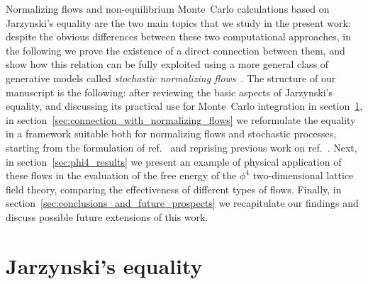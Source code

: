 \documentclass[11pt]{article}
\begin{document}
Normalizing flows and non-equilibrium Monte~Carlo calculations based on Jarzynski's equality are the two main topics that we study in the present work: despite the obvious differences between these two computational approaches, in the following we prove the existence of a direct connection between them, and show how this relation can be fully exploited using a more general class of generative models called \emph{stochastic normalizing flows}~\cite{Wu:2020snf}. The structure of our manuscript is the following: after reviewing the basic aspects of Jarzynski's equality, and discussing its practical use for Monte~Carlo integration in section~\ref{sec:Jarzynski_equality}, in section~\ref{sec:connection_with_normalizing_flows} we reformulate the equality in a framework suitable both for normalizing flows and stochastic processes, starting from the formulation of ref.~\cite{Nicoli:2020njz} and reprising previous work on ref.~\cite{Wu:2020snf}. Next, in section~\ref{sec:phi4_results} we present an example of physical application of these flows in the evaluation of the free energy of the $\phi^4$ two-dimensional lattice field theory, comparing the effectiveness of different types of flows. Finally, in section~\ref{sec:conclusions_and_future_prospects} we recapitulate our findings and discuss possible future extensions of this work.


\section{Jarzynski's equality}
\label{sec:Jarzynski_equality}
\end{document}
